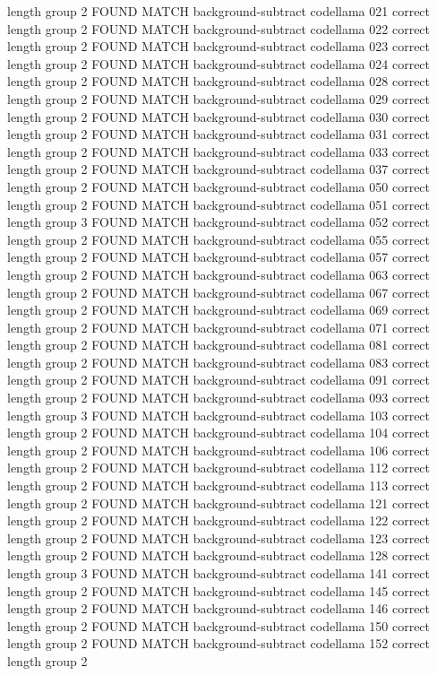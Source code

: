 length group  2
FOUND MATCH background-subtract codellama 021 correct
length group  2
FOUND MATCH background-subtract codellama 022 correct
length group  2
FOUND MATCH background-subtract codellama 023 correct
length group  2
FOUND MATCH background-subtract codellama 024 correct
length group  2
FOUND MATCH background-subtract codellama 028 correct
length group  2
FOUND MATCH background-subtract codellama 029 correct
length group  2
FOUND MATCH background-subtract codellama 030 correct
length group  2
FOUND MATCH background-subtract codellama 031 correct
length group  2
FOUND MATCH background-subtract codellama 033 correct
length group  2
FOUND MATCH background-subtract codellama 037 correct
length group  2
FOUND MATCH background-subtract codellama 050 correct
length group  2
FOUND MATCH background-subtract codellama 051 correct
length group  3
FOUND MATCH background-subtract codellama 052 correct
length group  2
FOUND MATCH background-subtract codellama 055 correct
length group  2
FOUND MATCH background-subtract codellama 057 correct
length group  2
FOUND MATCH background-subtract codellama 063 correct
length group  2
FOUND MATCH background-subtract codellama 067 correct
length group  2
FOUND MATCH background-subtract codellama 069 correct
length group  2
FOUND MATCH background-subtract codellama 071 correct
length group  2
FOUND MATCH background-subtract codellama 081 correct
length group  2
FOUND MATCH background-subtract codellama 083 correct
length group  2
FOUND MATCH background-subtract codellama 091 correct
length group  2
FOUND MATCH background-subtract codellama 093 correct
length group  3
FOUND MATCH background-subtract codellama 103 correct
length group  2
FOUND MATCH background-subtract codellama 104 correct
length group  2
FOUND MATCH background-subtract codellama 106 correct
length group  2
FOUND MATCH background-subtract codellama 112 correct
length group  2
FOUND MATCH background-subtract codellama 113 correct
length group  2
FOUND MATCH background-subtract codellama 121 correct
length group  2
FOUND MATCH background-subtract codellama 122 correct
length group  2
FOUND MATCH background-subtract codellama 123 correct
length group  2
FOUND MATCH background-subtract codellama 128 correct
length group  3
FOUND MATCH background-subtract codellama 141 correct
length group  2
FOUND MATCH background-subtract codellama 145 correct
length group  2
FOUND MATCH background-subtract codellama 146 correct
length group  2
FOUND MATCH background-subtract codellama 150 correct
length group  2
FOUND MATCH background-subtract codellama 152 correct
length group  2
